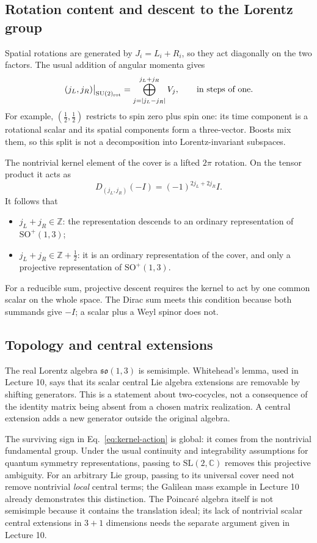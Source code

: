 \documentclass[11pt]{article}
\newcommand{\SO}{\mathrm{SO}}
\newcommand{\C}{\mathbb C}
\newcommand{\Z}{\mathbb Z}
\newcommand{\SU}{\mathrm{SU}}
\newcommand{\SL}{\mathrm{SL}}
\newcommand{\so}{\mathfrak{so}}
\newcommand{\Lor}{\SO^+(1,3)}
\begin{document}
\subsection{Rotation content and descent to the Lorentz group}
Spatial rotations are generated by \(J_i=L_i+R_i\), so they act
diagonally on the two factors. The usual addition of angular momenta gives
\begin{equation}
 (j_L,j_R)\big|_{\SU(2)_{\rm rot}}
 =\bigoplus_{j=|j_L-j_R|}^{j_L+j_R} V_j,
 \qquad\text{in steps of one.}
 \label{eq:rotation-content}
\end{equation}
For example, \((\tfrac12,\tfrac12)\) restricts to spin zero plus spin
one: its time component is a rotational scalar and its spatial
components form a three-vector. Boosts mix them, so this split is not
a decomposition into Lorentz-invariant subspaces.

The nontrivial kernel element of the cover is a lifted \(2\pi\) rotation.
On the tensor product it acts as
\begin{equation}
 D_{(j_L,j_R)}(-I)=(-1)^{2j_L+2j_R}I.
 \label{eq:kernel-action}
\end{equation}
It follows that
\begin{itemize}
\item \(j_L+j_R\in\Z\): the representation descends to an ordinary
representation of \(\Lor\);
\item \(j_L+j_R\in\Z+\tfrac12\): it is an ordinary representation of
the cover, and only a projective representation of \(\Lor\).
\end{itemize}
For a reducible sum, projective descent requires the kernel to act by
one common scalar on the whole space. The Dirac sum meets this condition
because both summands give \(-I\); a scalar plus a Weyl spinor does not.

\subsection{Topology and central extensions}
The real Lorentz algebra \(\so(1,3)\) is semisimple. Whitehead's lemma,
used in Lecture 10, says that its scalar central Lie algebra extensions
are removable by shifting generators. This is a statement about
two-cocycles, not a consequence of the identity matrix being absent
from a chosen matrix realization. A central extension adds a new
generator outside the original algebra.

The surviving sign in Eq.~\eqref{eq:kernel-action} is global: it comes
from the nontrivial fundamental group. Under the usual continuity and
integrability assumptions for quantum symmetry representations, passing
to \(\SL(2,\C)\) removes this projective ambiguity. For an arbitrary
Lie group, passing to its universal cover need not remove nontrivial
\emph{local} central terms; the Galilean mass example in Lecture 10
already demonstrates this distinction. The Poincar\'e algebra itself
is not semisimple because it contains the translation ideal; its lack
of nontrivial scalar central extensions in \(3+1\) dimensions needs
the separate argument given in Lecture 10.
\end{document}
